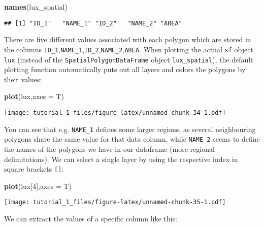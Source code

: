 \documentclass[]{article}
\newenvironment{Shaded}{\begin{snugshade}}{\end{snugshade}}
\newcommand{\DataTypeTok}[1]{\textcolor[rgb]{0.13,0.29,0.53}{#1}}
\newcommand{\DecValTok}[1]{\textcolor[rgb]{0.00,0.00,0.81}{#1}}
\newcommand{\KeywordTok}[1]{\textcolor[rgb]{0.13,0.29,0.53}{\textbf{#1}}}
\newcommand{\NormalTok}[1]{#1}
\newcommand{\OperatorTok}[1]{\textcolor[rgb]{0.81,0.36,0.00}{\textbf{#1}}}
\begin{document}
\begin{Shaded}
\begin{Highlighting}[]
\KeywordTok{names}\NormalTok{(lux_spatial)}
\end{Highlighting}
\end{Shaded}

\begin{verbatim}
## [1] "ID_1"   "NAME_1" "ID_2"   "NAME_2" "AREA"
\end{verbatim}

There are five different values associated with each polygon which are
stored in the columns
\texttt{ID\_1},\texttt{NAME\_1},\texttt{ID\_2},\texttt{NAME\_2},\texttt{AREA}.
When plotting the actual \texttt{sf} object \texttt{lux} (instead of the
\texttt{SpatialPolygonDataFrame} object \texttt{lux\_spatial}), the
default plotting function automatically puts out all layers and colors
the polygons by their values:

\begin{Shaded}
\begin{Highlighting}[]
\KeywordTok{plot}\NormalTok{(lux,}\DataTypeTok{axes =}\NormalTok{ T)}
\end{Highlighting}
\end{Shaded}

\texttt{[image: tutorial\_1\_files/figure-latex/unnamed-chunk-34-1.pdf]}

You can see that e.g. \texttt{NAME\_1} defines some larger regions, as
several neighbouring polygons share the same value for that data column,
while \texttt{NAME\_2} seems to define the names of the polygons we have
in our dataframe (more regional delimitations). We can select a single
layer by using the respective index in square brackets \texttt{{[}{]}}:

\begin{Shaded}
\begin{Highlighting}[]
\KeywordTok{plot}\NormalTok{(lux[}\DecValTok{4}\NormalTok{],}\DataTypeTok{axes =}\NormalTok{ T)}
\end{Highlighting}
\end{Shaded}

\texttt{[image: tutorial\_1\_files/figure-latex/unnamed-chunk-35-1.pdf]}

We can extract the values of a specific column like this:

\begin{Shaded}
\end{Shaded}
\end{document}
